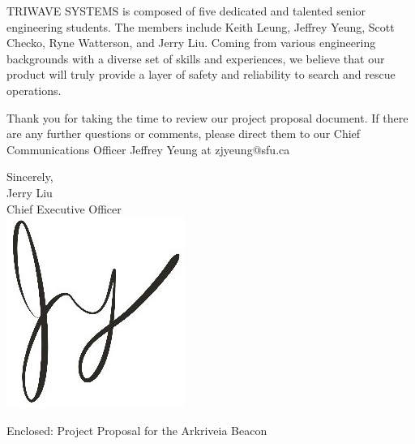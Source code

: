 \documentclass[11pt]{letter}
\begin{document}
\begin{letter}
\bigskip
TRIWAVE SYSTEMS is composed of five dedicated and talented senior engineering students. The members include Keith Leung, Jeffrey Yeung, Scott Checko, Ryne Watterson, and Jerry Liu. Coming from various engineering backgrounds with a diverse set of skills and experiences, we believe that our product will truly provide a layer of safety and reliability to search and rescue operations.

\bigskip
Thank you for taking the time to review our project proposal document. If there are any further questions or comments, please direct them to our Chief Communications Officer Jeffrey Yeung at zjyeung@sfu.ca


\medskip
Sincerely,\\
Jerry Liu\\
Chief Executive Officer\\

\vspace*{-0.25cm}
\includegraphics[scale=0.8]{./images/signature.jpg}

{Enclosed: Project Proposal for the Arkriveia Beacon}

\end{letter}
\end{document}
